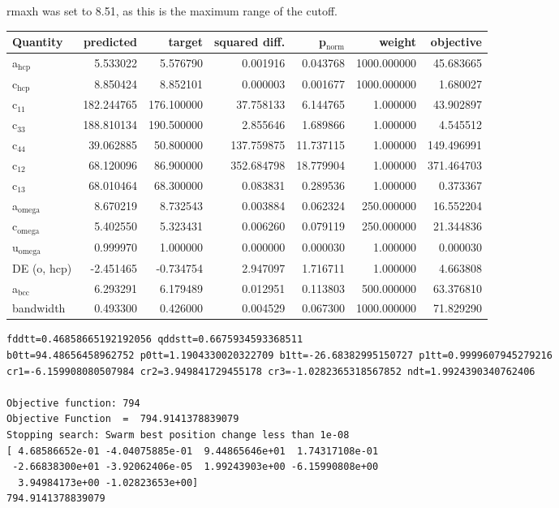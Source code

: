 \documentclass[11pt]{article}
\begin{document}
rmaxh was set to 8.51, as this is the maximum range of the cutoff. 

\begin{center}
\begin{tabular}{lrrrrrr}
Quantity & predicted & target & squared diff. & p$_{\text{norm}}$ & weight & objective\\
\hline
a$_{\text{hcp}}$ & 5.533022 & 5.576790 & 0.001916 & 0.043768 & 1000.000000 & 45.683665\\
c$_{\text{hcp}}$ & 8.850424 & 8.852101 & 0.000003 & 0.001677 & 1000.000000 & 1.680027\\
c$_{\text{11}}$ & 182.244765 & 176.100000 & 37.758133 & 6.144765 & 1.000000 & 43.902897\\
c$_{\text{33}}$ & 188.810134 & 190.500000 & 2.855646 & 1.689866 & 1.000000 & 4.545512\\
c$_{\text{44}}$ & 39.062885 & 50.800000 & 137.759875 & 11.737115 & 1.000000 & 149.496991\\
c$_{\text{12}}$ & 68.120096 & 86.900000 & 352.684798 & 18.779904 & 1.000000 & 371.464703\\
c$_{\text{13}}$ & 68.010464 & 68.300000 & 0.083831 & 0.289536 & 1.000000 & 0.373367\\
a$_{\text{omega}}$ & 8.670219 & 8.732543 & 0.003884 & 0.062324 & 250.000000 & 16.552204\\
c$_{\text{omega}}$ & 5.402550 & 5.323431 & 0.006260 & 0.079119 & 250.000000 & 21.344836\\
u$_{\text{omega}}$ & 0.999970 & 1.000000 & 0.000000 & 0.000030 & 1.000000 & 0.000030\\
DE (o, hcp) & -2.451465 & -0.734754 & 2.947097 & 1.716711 & 1.000000 & 4.663808\\
a$_{\text{bcc}}$ & 6.293291 & 6.179489 & 0.012951 & 0.113803 & 500.000000 & 63.376810\\
bandwidth & 0.493300 & 0.426000 & 0.004529 & 0.067300 & 1000.000000 & 71.829290\\
\end{tabular}
\end{center}

\begin{verbatim}
fddtt=0.46858665192192056 qddstt=0.6675934593368511 
b0tt=94.48656458962752 p0tt=1.1904330020322709 b1tt=-26.68382995150727 p1tt=0.9999607945279216 
cr1=-6.159908080507984 cr2=3.949841729455178 cr3=-1.0282365318567852 ndt=1.9924390340762406

Objective function: 794
Objective Function  =  794.9141378839079
Stopping search: Swarm best position change less than 1e-08
[ 4.68586652e-01 -4.04075885e-01  9.44865646e+01  1.74317108e-01
 -2.66838300e+01 -3.92062406e-05  1.99243903e+00 -6.15990808e+00
  3.94984173e+00 -1.02823653e+00]
794.9141378839079
\end{verbatim}
\end{document}
